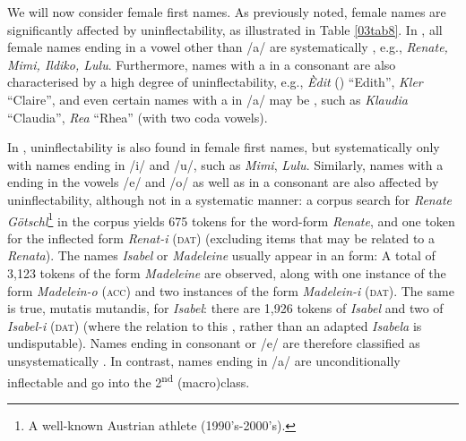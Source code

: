 \documentclass[output=paper,colorlinks,citecolor=brown]{langscibook}
\begin{document}
We will now consider female first names. As previously noted, female names are significantly affected by uninflectability, as illustrated in Table \ref{03tab8}. In , all female names ending in a vowel other than /a/ are systematically , e.g., \emph{Renate, Mimi, Ildiko, Lulu}. Furthermore, names with a  in a consonant are also characterised by a high degree of uninflectability, e.g., \emph{Èdit} () ``Edith'', \emph{Kler} ``Claire'', and even certain names with a  in /a/ may be , such as \emph{Klaudia} ``Claudia'', \emph{Rea} ``Rhea'' (with two coda vowels).

In , uninflectability is also found in female first names, but systematically only with names ending in /i/ and /u/, such as \emph{Mimi}, \emph{Lulu}. Similarly, names with a  ending in the vowels /e/ and /o/ as well as in a consonant are also affected by uninflectability, although not in a systematic manner: a corpus search for \emph{Renate Götschl}\footnote{A well-known Austrian athlete (1990's-2000's).} in the  corpus  yields 675 tokens for the word-form \emph{Renate}, and one token for the inflected form \emph{Renat-i} (\textsc{dat}) (excluding items that may be related to a  \emph{Renata}). The names \emph{Isabel} or \emph{Madeleine} usually appear in an  form: A total of 3,123 tokens of the form \emph{Madeleine} are observed, along with one instance of the form \emph{Madelein-o} (\textsc{acc}) and two instances of the form \emph{Madelein-i} (\textsc{dat}). The same is true, mutatis mutandis, for \emph{Isabel}: there are 1,926 tokens of \emph{Isabel} and two of \emph{Isabel-i} (\textsc{dat}) (where the relation to this , rather than an adapted \emph{Isabela} is undisputable). Names ending in consonant or /e/ are therefore classified as unsystematically . In contrast, names ending in /a/ are unconditionally inflectable and go into the 2\textsuperscript{nd} (macro)class.
\end{document}
